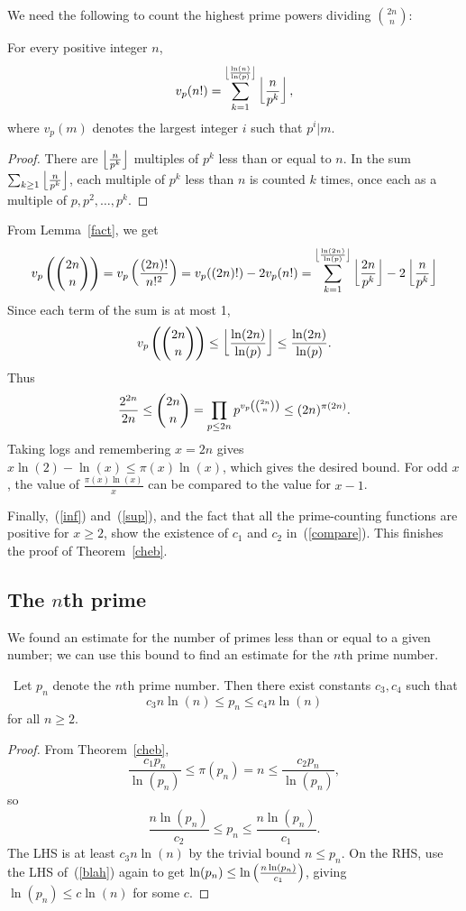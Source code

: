 We need the following to count the highest prime powers dividing $\binom{2n}{n}$:
\begin{lem}\label{fact}\cite[Lemma 6.3]{pftb}
For every positive integer $n$, 
\[v_p(n!)=\sum_{k=1}^{\left\lfloor {\frac{\ln(n)}{\ln(p)}}\right\rfloor} \left\lfloor {\frac{n}{p^k}}\right\rfloor,\]
where $v_p(m)$ denotes the largest integer $i$ such that $p^i|m$.
\end{lem}
\begin{proof}
There are $\left\lfloor {\frac{n}{p^k}}\right\rfloor$ multiples of $p^k$ less than or equal to $n$. In the sum $\sum_{k\geq 1} \left\lfloor {\frac{n}{p^k}}\right\rfloor$, each multiple of $p^k$ less than $n$ is counted $k$ times, once each as a multiple of $p,p^2,\ldots, p^k$.
\end{proof}
From Lemma~\ref{fact}, we get
\[
v_p\left( {\binom{2n}{n}} \right) =v_p\left( {\frac{(2n)!}{n!^2}} \right)=v_p((2n)!)-2v_p(n!)
=\sum_{k=1}^{\left\lfloor {\frac{\ln(2n)}{\ln(p)}}\right\rfloor} \left\lfloor {\frac{2n}{p^k}}\right\rfloor- 2\left\lfloor {\frac{n}{p^k}}\right\rfloor
\]
Since each term of the sum is at most 1,
\[
v_p\left( {\binom{2n}{n}} \right)\leq \left\lfloor {\frac{\ln(2n)}{\ln(p)}}\right\rfloor\leq \frac{\ln(2n)}{\ln(p)}.
\]
Thus
\[\frac{2^{2n}}{2n}\leq \binom{2n}{n}= \prod_{p\leq 2n} p^{v_p\left( {\binom{2n}{n}} \right)}\leq (2n)^{\pi(2n)}.\]
Taking logs and remembering $x=2n$ gives %
$x\ln(2)-\ln(x)\leq \pi(x)\ln(x)$, which gives the desired bound. For odd $x$, the value of $\frac{\pi(x)\ln(x)}{x}$ can be compared to the value for $x-1$.

Finally,~(\ref{inf}) and~(\ref{sup}), and the fact that all the prime-counting functions are positive for $x\geq 2$, show the existence of $c_1$ and $c_2$ in~(\ref{compare}).  
This finishes the proof of Theorem~\ref{cheb}.
%
\subsection{The $n$th prime}
We found an estimate for the number of primes less than or equal to a given number; we can use this bound to find an estimate for the $n$th prime number.
\begin{thm}\
Let $p_n$ denote the $n$th prime number. Then there exist constants $c_3,c_4$ such that 
\[c_3n\ln(n)\leq p_n\leq c_4n\ln(n)\]
for all $n\geq 2$.
\end{thm}
\begin{proof}
From Theorem~\ref{cheb},
\begin{equation}
\label{blah}
\frac{c_1p_n}{\ln(p_n)}\leq \pi(p_n)=n\leq \frac{c_2p_n}{\ln(p_n)}, 
\end{equation}
so
\[\frac{n\ln(p_n)}{c_2}\leq p_n\leq \frac{n\ln(p_n)}{c_1}.\]
The LHS is at least $c_3n\ln(n)$ by the trivial bound $n\leq p_n$. On the RHS, use %
the LHS of~(\ref{blah}) again to get $\ln(p_n)\leq \ln\left( {\frac{n\ln(p_n)}{c_1}} \right)$, giving $\ln(p_n)\leq c\ln(n)$ for some $c$. 
\end{proof}
